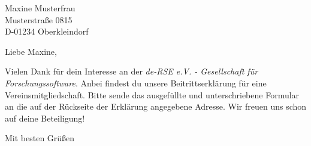 \documentclass[de-RSE_Brief,a4paper]{scrlttr2}
\begin{document}

\begin{letter}{
    Maxine Musterfrau\\
    Musterstraße 0815\\
    D-01234 Oberkleindorf
}
\opening{Liebe Maxine,}
Vielen Dank für dein Interesse an der \emph{de-RSE e.V. - Gesellschaft für Forschungssoftware}.
Anbei findest du unsere Beitrittserklärung für eine Vereinsmitgliedschaft. Bitte sende das
ausgefüllte und unterschriebene Formular an die auf der Rückseite der Erklärung angegebene Adresse.
Wir freuen uns schon auf deine Beteiligung!

\closing{Mit besten Grüßen}
\end{letter}
\end{document}
